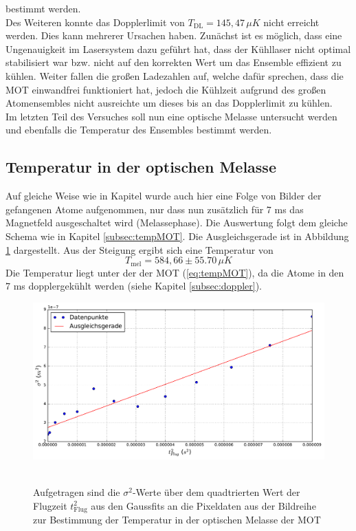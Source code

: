 \documentclass[twoside,colorback,accentcolor=tud4c,11pt]{tudreport}
\begin{document}
bestimmt werden.\\
Des Weiteren konnte das Dopplerlimit von $T_{\text{DL}}=145,47\,\si{\mu K}$ \cite{limit} nicht erreicht werden. Dies kann mehrerer Ursachen haben. Zunächst ist es möglich, dass eine Ungenauigkeit im Lasersystem dazu geführt hat, dass der Kühllaser nicht optimal stabilisiert war bzw. nicht auf den korrekten Wert um das Ensemble effizient zu kühlen. Weiter fallen die großen Ladezahlen auf, welche dafür sprechen, dass die MOT einwandfrei funktioniert hat, jedoch die Kühlzeit aufgrund des großen Atomensembles nicht ausreichte um dieses bis an das Dopplerlimit zu kühlen.\\
Im letzten Teil des Versuches soll nun eine optische Melasse untersucht werden und ebenfalls die Temperatur des Ensembles bestimmt werden.
\subsection{Temperatur in der optischen Melasse}
Auf gleiche Weise wie in Kapitel \textit{} wurde auch hier eine Folge von Bilder der gefangenen Atome aufgenommen, nur dass nun zusätzlich für 7 ms das Magnetfeld ausgeschaltet wird (Melassephase). Die Auswertung folgt dem gleiche Schema wie in Kapitel \ref{subsec:tempMOT}. Die Ausgleichsgerade ist in Abbildung \ref{tmel} dargestellt. Aus der Steigung ergibt sich eine Temperatur von
\begin{equation}
T_{\text{mel}}=584,66 \pm 55.70\,\mu \si{K}
\end{equation}
Die Temperatur liegt unter der der MOT (\ref{eq:tempMOT}), da die Atome in den 7 ms dopplergekühlt werden (siehe Kapitel \ref{subsec:doppler}).
\begin{figure}[H]
\centering
   	\begin{minipage}[b]{0.85\textwidth}
   	\includegraphics[width=\textwidth]{graphics/tempmel.pdf}\
   	\end{minipage}
\caption{Aufgetragen sind die $\sigma^2$-Werte über dem quadtrierten Wert der Flugzeit $t_{\text{Flug}}^2$ aus den Gaussfits an die Pixeldaten aus der Bildreihe zur Bestimmung der Temperatur in der optischen Melasse der MOT}\label{tmel}	
\end{figure}
\end{document}
